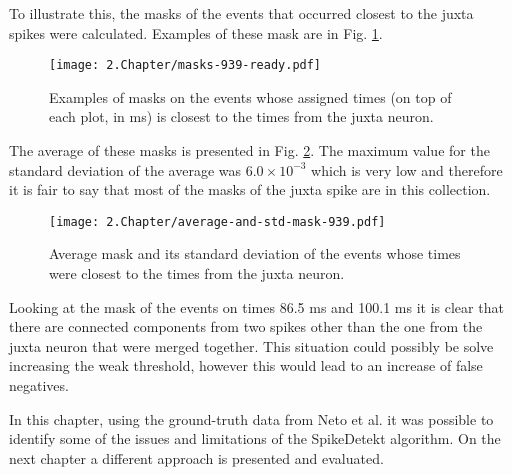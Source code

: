 To illustrate this, the masks of the events that occurred closest to the juxta spikes were calculated. Examples of these mask are in Fig. \ref{fig:masks-examples}.
 
\begin{figure}[!h]
	\centering
	\texttt{[image: 2.Chapter/masks-939-ready.pdf]}
	\caption{Examples of masks on the events whose assigned times (on top of each plot, in ms) is closest to the times from the juxta neuron.
}
\label{fig:masks-examples}
\end{figure}

The average of these masks is presented in Fig. \ref{fig:masks-average-std}. The maximum value for the standard deviation of the average was $6.0 \times 10^{-3}$ which is very low and therefore it is fair to say that most of the masks of the juxta spike are in this collection.

\begin{figure}[!h]
	\centering
	\texttt{[image: 2.Chapter/average-and-std-mask-939.pdf]}
	\caption{Average mask and its standard deviation of the events whose times were closest to the times from the juxta neuron.
}
\label{fig:masks-average-std}
\end{figure}


Looking at the mask of the events on times 86.5 ms  and 100.1 ms it is clear that there are connected components from two spikes other than the one from the juxta neuron that were merged together. This situation could possibly be solve increasing the weak threshold, however this would lead to an increase of false negatives. 

In this chapter, using the ground-truth data from Neto et al. it was possible to identify some of the issues and limitations of the SpikeDetekt algorithm. On the next chapter a different approach is presented and evaluated.
